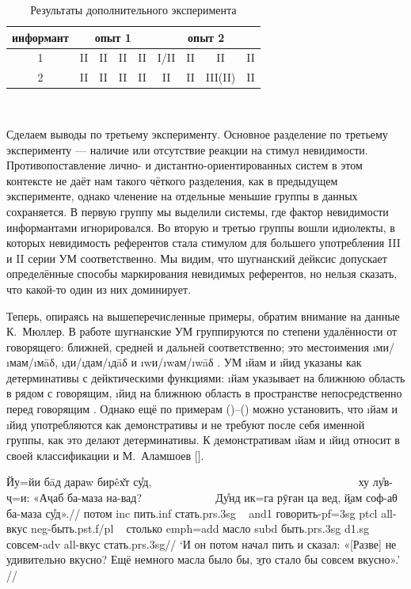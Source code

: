 \begin{table}
 \centering
 \caption{Результаты дополнительного эксперимента}
 \smallskip
 \label{tab:dem6}
 \begin{tabular}{c|cccc|cccc} \toprule
 информант & \multicolumn{4}{c|}{опыт 1} & \multicolumn{4}{c}{опыт 2} \\ \midrule
 1 & II & II & II & II & I/II & II & II & II \\
 2 & II & II & II & II & II & II & III(II) & II\\ \bottomrule
 \end{tabular}
 \\
 \medskip
\end{table}

Сделаем выводы по третьему эксперименту. Основное разделение по третьему эксперименту — наличие или отсутствие реакции на стимул невидимости. Противопоставление лично- и дистантно-ориентированных систем в этом контексте не даёт нам такого чёткого разделения, как в предыдущем эксперименте, однако членение на отдельные меньшие группы в данных сохраняется. В первую группу мы выделили системы, где фактор невидимости информантами игнорировался. Во вторую и третью группы вошли идиолекты, в которых невидимость референтов стала стимулом для большего употребления III и II серии УМ соответственно. Мы видим, что шугнанский дейксис допускает определённые способы маркирования невидимых референтов, но нельзя сказать, что какой-то один из них доминирует.

Теперь, опираясь на вышеперечисленные примеры, обратим внимание на данные К.~Мюллер. В работе \parencite{muller2015} шугнанские УМ группируются по степени удалённости от говорящего: ближней, средней и дальней соответственно; это местоимения \i{ми}/\i{мам}/\i{мāδ}, \i{ди}/\i{дам}/\i{дāδ} и \i{wи}/\i{wам}/\i{wāδ} \parencite[57]{muller2015}. УМ \i{йам} и \i{йид} указаны как детерминативы с дейктическими функциями: \i{йам} указывает на ближнюю область в рядом с говорящим, \i{йид} на ближнюю область в пространстве непосредственно перед говорящим \parencite[59]{muller2015}. Однако ещё по примерам ()–() \parencites[74–77]{belikov1972}[22]{yusufbekov1998} можно установить, что \i{йам} и \i{йид} употребляются как демонстративы и не требуют после себя именной группы, как это делают детерминативы. К демонстративам \i{йам} и \i{йид} относит в своей классификации и М.~Аламшоев [\cite*[31]{alamshoev1994}].

\begingl
\gla Йу=йи бāд дараw бирêх̌т су̊д, ~~~~~~~~~~~~~~~~~~~~~~~~~~~~~~~~~~~~ ху лу̊в-ҷ=и: «Аҷаб ба-маза на-вад? ~~~~~~~~~~~~ Ду̊нд ик=га рӯған ца вед, \b{йам} соф-аθ ба-маза су̊д».//
 потом {\sc inc} пить.{\sc inf} стать.{\sc prs.3sg} ~ {\sc and1} говорить-{\sc pf=3sg} {\sc ptcl} {\sc all}-вкус {\sc neg}-быть.{\sc pst.f/pl} ~ столько {\sc emph=add} масло {\sc subd} быть.{\sc prs.3sg} {\sc d1.sg} совсем-{\sc adv} {\sc all}-вкус стать.{\sc prs.3sg}//
\glft ‘И он потом начал пить и сказал: «[Разве] не удивительно вкусно? Ещё немного масла было бы, \b{это} стало бы совсем вкусно».’ //
\endgl \xe

